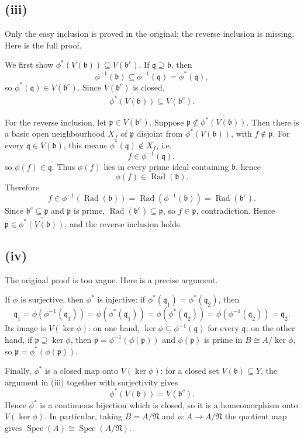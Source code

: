 \documentclass[11pt]{article}
\DeclareMathOperator{\Spec}{Spec}
\DeclareMathOperator{\Rad}{Rad}
\newcommand{\fp}{\mathfrak p}
\newcommand{\fb}{\mathfrak b}
\newcommand{\fq}{\mathfrak q}
\newcommand{\fN}{\mathfrak N}
\begin{document}
\subsection*{(iii)}
Only the easy inclusion is proved in the original; the reverse inclusion is
missing.  Here is the full proof.

We first show \(\phi^*(V(\fb))\subseteq V(\fb^c)\).  If \(\fq\supseteq\fb\),
then
\[
\phi^{-1}(\fb)\subseteq\phi^{-1}(\fq)=\phi^*(\fq),
\]
so \(\phi^*(\fq)\in V(\fb^c)\).  Since \(V(\fb^c)\) is closed,
\[
\overline{\phi^*(V(\fb))}\subseteq V(\fb^c).
\]

For the reverse inclusion, let \(\fp\in V(\fb^c)\).  Suppose
\(\fp\notin\overline{\phi^*(V(\fb))}\).  Then there is a basic open
neighbourhood \(X_f\) of \(\fp\) disjoint from \(\phi^*(V(\fb))\), with
\(f\notin\fp\).  For every \(\fq\in V(\fb)\), this means
\(\phi^*(\fq)\notin X_f\), i.e.\
\[
f\in\phi^{-1}(\fq),
\]
so \(\phi(f)\in\fq\).  Thus \(\phi(f)\) lies in every prime ideal containing
\(\fb\), hence
\[
\phi(f)\in\Rad(\fb).
\]
Therefore
\[
f\in\phi^{-1}(\Rad(\fb))=\Rad(\phi^{-1}(\fb))=\Rad(\fb^c).
\]
Since \(\fb^c\subseteq\fp\) and \(\fp\) is prime, \(\Rad(\fb^c)\subseteq\fp\),
so \(f\in\fp\), contradiction.  Hence
\(\fp\in\overline{\phi^*(V(\fb))}\), and the reverse inclusion holds.

\subsection*{(iv)}
The original proof is too vague.  Here is a precise argument.

If \(\phi\) is surjective, then \(\phi^*\) is injective: if
\(\phi^*(\fq_1)=\phi^*(\fq_2)\), then
\[
\fq_1=\phi(\phi^{-1}(\fq_1))
=\phi(\phi^*(\fq_1))
=\phi(\phi^*(\fq_2))
=\phi(\phi^{-1}(\fq_2))=\fq_2.
\]
Its image is \(V(\ker\phi)\): on one hand,
\(\ker\phi\subseteq\phi^{-1}(\fq)\) for every \(\fq\); on the other hand,
if \(\fp\supseteq\ker\phi\), then \(\fp=\phi^{-1}(\phi(\fp))\) and
\(\phi(\fp)\) is prime in \(B\cong A/\ker\phi\), so
\(\fp=\phi^*(\phi(\fp))\).

Finally, \(\phi^*\) is a closed map onto \(V(\ker\phi)\): for a closed set
\(V(\fb)\subseteq Y\), the argument in (iii) together with surjectivity gives
\[
\phi^*(V(\fb))=V(\fb^c).
\]
Hence \(\phi^*\) is a continuous bijection which is closed, so it is a
homeomorphism onto \(V(\ker\phi)\).  In particular, taking
\(B=A/\fN\) and \(\phi:A\to A/\fN\) the quotient map gives
\(\Spec(A)\cong\Spec(A/\fN)\).
\end{document}

